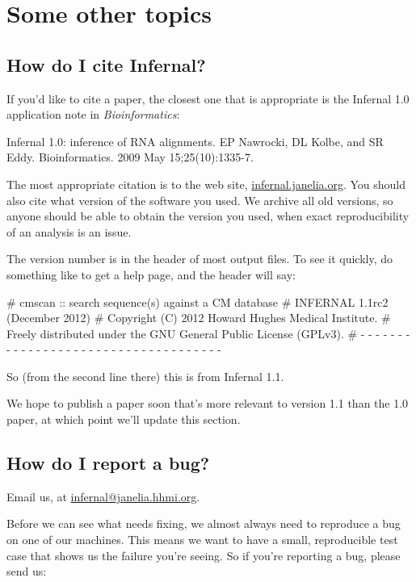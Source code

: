 \section{Some other topics}
\label{section:more}
\setcounter{footnote}{0}

\subsection{How do I cite Infernal?}

If you'd like to cite a paper, the closest one that is appropriate is
the Infernal 1.0 application note in \emph{Bioinformatics}:

Infernal 1.0: inference of RNA alignments. 
EP Nawrocki, DL Kolbe, and SR Eddy.
Bioinformatics. 2009 May 15;25(10):1335-7. 

The most appropriate citation is to the web site,
\url{infernal.janelia.org}. You should also cite what version of the
software you used. We archive all old versions, so anyone should be
able to obtain the version you used, when exact reproducibility of an
analysis is an issue.

The version number is in the header of most output files. To see it
quickly, do something like  to get a help page, and
the header will say:

\begin{sreoutput}
# cmscan :: search sequence(s) against a CM database
# INFERNAL 1.1rc2 (December 2012)
# Copyright (C) 2012 Howard Hughes Medical Institute.
# Freely distributed under the GNU General Public License (GPLv3).
# - - - - - - - - - - - - - - - - - - - - - - - - - - - - - - - - - - - -
\end{sreoutput}

So (from the second line there) this is from Infernal 1.1.

We hope to publish a paper soon that's more relevant to version 1.1
than the 1.0 paper, at which point we'll update this section.

\subsection{How do I report a bug?}

Email us, at \url{infernal@janelia.hhmi.org}.

Before we can see what needs fixing, we almost always need to
reproduce a bug on one of our machines. This means we want to have a
small, reproducible test case that shows us the failure you're seeing.
So if you're reporting a bug, please send us:


